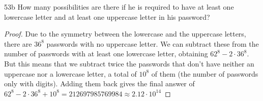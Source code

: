 \begin{exercise}{53b}
    How many possibilities are there if he is required to have at least one lowercase letter and at least one uppercase letter in his password?
\end{exercise}

\begin{proof}
    Due to the symmetry between the lowercase and the uppercase letters, there are $36^8$ passwords with no uppercase letter. We can subtract these from the number of passwords with at least one lowercase letter, obtaining $62^8-2 \cdot 36^8$. But this means that we subtract twice the passwords that don't have neither an uppercase nor a lowercase letter, a total of $10^8$ of them (the number of passwords only with digits). Adding them back gives the final answer of $62^8-2 \cdot 36^8 + 10^8 = 212697985769984 \approx 2.12 \cdot 10^{14}$
\end{proof}


